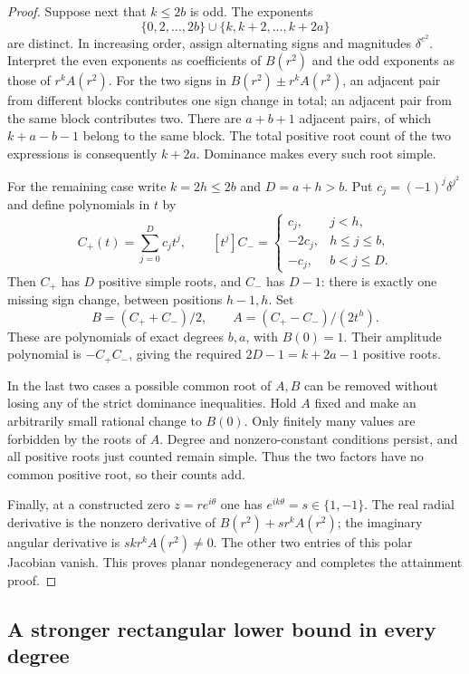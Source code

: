 \documentclass[UTF8,11pt]{ctexart}
\theoremstyle{definition}
\numberwithin{equation}{section}
\begin{document}
\begin{proof}
Suppose next that $k\le2b$ is odd. The exponents
\[
 \{0,2,\ldots,2b\}\cup\{k,k+2,\ldots,k+2a\}
\]
are distinct. In increasing order, assign alternating signs and
magnitudes $\delta^{e^2}$. Interpret the even exponents as coefficients
of $B(r^2)$ and the odd exponents as those of $r^kA(r^2)$.
For the two signs in $B(r^2)\pm r^kA(r^2)$, an adjacent pair from
different blocks contributes one sign change in total; an adjacent
pair from the same block contributes two. There are $a+b+1$ adjacent
pairs, of which $k+a-b-1$ belong to the same block. The total positive
root count of the two expressions is consequently $k+2a$.
Dominance makes every such root simple.

For the remaining case write $k=2h\le2b$ and $D=a+h>b$. Put
$c_j=(-1)^j\delta^{j^2}$ and define polynomials in $t$ by
\[
 C_+(t)=\sum_{j=0}^{D}c_jt^j,\qquad
 [t^j]C_-=
 \begin{cases}
 c_j,&j<h,\\
 -2c_j,&h\le j\le b,\\
 -c_j,&b<j\le D.
 \end{cases}
\]
Then $C_+$ has $D$ positive simple roots, and $C_-$ has $D-1$:
there is exactly one missing sign change, between positions $h-1,h$.
Set
\[
 B=(C_++C_-)/2,\qquad A=(C_+-C_-)/(2t^h).
\]
These are polynomials of exact degrees $b,a$, with $B(0)=1$.
Their amplitude polynomial is $-C_+C_-$, giving the required
$2D-1=k+2a-1$ positive roots.

In the last two cases a possible common root of $A,B$ can be removed
without losing any of the strict dominance inequalities. Hold $A$
fixed and make an arbitrarily small rational change to $B(0)$.
Only finitely many values are forbidden by the roots of $A$.
Degree and nonzero-constant conditions persist, and all positive roots
just counted remain simple. Thus the two factors have no common
positive root, so their counts add.

Finally, at a constructed zero $z=re^{i\theta}$ one has
$e^{ik\theta}=s\in\{1,-1\}$. The real radial derivative is the
nonzero derivative of $B(r^2)+s r^k A(r^2)$; the imaginary angular
derivative is $s k r^k A(r^2)\ne0$. The other two entries of this
polar Jacobian vanish. This proves planar nondegeneracy and completes
the attainment proof.
\end{proof}

\subsection{A stronger rectangular lower bound in every degree}\label{new:sec:rectangle}
\end{document}
